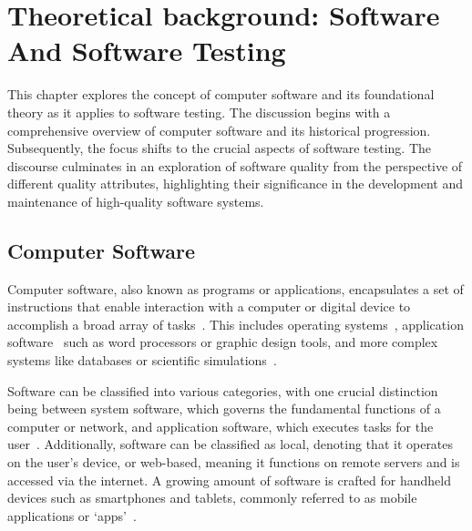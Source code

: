 \vspace{21.5pt}
\chapter{Theoretical background: Software And Software Testing}

This chapter explores the concept of computer software and its foundational
theory as it applies to software testing. The discussion begins with a
comprehensive overview of computer software and its historical progression.
Subsequently, the focus shifts to the crucial aspects of software testing.
The discourse culminates in an exploration of software quality from the
perspective of different quality attributes, highlighting their
significance in the development and maintenance of high-quality software systems.

\section{Computer Software}
Computer software, also known as programs or applications, encapsulates a set of instructions that
enable interaction with a computer or digital device to accomplish a broad array of
tasks~\cite{Software76:online}. This includes operating systems~\cite{stallings1998operating},
application software~\cite{Definiti63:online} such as
word processors or graphic design tools, and more complex systems like databases or
scientific simulations~\cite{Definiti63:online}.

Software can be classified into various categories, with one crucial distinction
being between system software, which governs the fundamental functions of a
computer or network, and application software, which executes tasks for the
user~\cite{WhatisSy89:online}\cite{Definiti63:online}.
Additionally, software can be classified as local, denoting that it operates on
the user's device, or web-based, meaning it functions on remote servers and is
accessed via the internet. A growing amount of software is crafted for handheld
devices such as smartphones and tablets, commonly referred to as mobile
applications or `apps'~\cite{yetisen2014regulation}.


